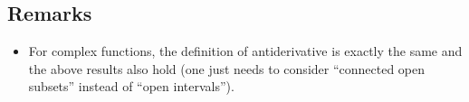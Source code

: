 \documentclass{article}
\begin{document}
\subsection{Remarks}
\begin{itemize}
\item For complex functions, the definition of antiderivative is exactly the same and the above results also hold (one just needs to consider ``connected open subsets'' instead of ``open intervals'').
\end{itemize}
\end{document}
